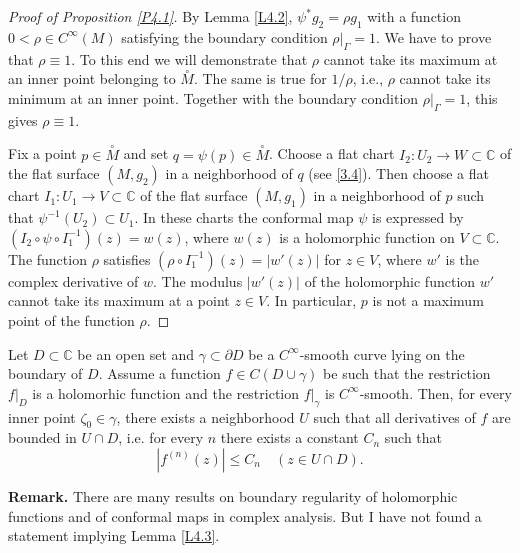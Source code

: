 \documentclass[12pt,reqno]{amsart}
\begin{document}
\begin{proof}[Proof of Proposition \ref{P4.1}]
By Lemma \ref{L4.2}, $\psi^*g_2=\rho g_1$ with a function $0<\rho\in C^\infty(M)$ satisfying the boundary condition $\rho|_\Gamma=1$. We have to prove that $\rho\equiv1$. To this end we will demonstrate that $\rho$ cannot take its maximum at an inner point belonging to
$\stackrel\circ M$. The same is true for $1/\rho$, i.e., $\rho$ cannot take its minimum at an inner point. Together with the boundary condition $\rho|_\Gamma=1$, this gives $\rho\equiv1$.

Fix a point $p\in\stackrel\circ M$ and set $q=\psi(p)\in\stackrel\circ M$. Choose a flat chart
$I_2:U_2\to W\subset{\mathbb C}$ of the flat surface $(M,g_2)$ in a neighborhood  of $q$ (see \eqref{3.4}). Then choose a flat chart $I_1:U_1\to V\subset{\mathbb C}$ of the flat surface $(M,g_1)$ in a neighborhood  of $p$ such that $\psi^{-1}(U_2)\subset U_1$. In these charts the conformal map $\psi$ is expressed by $(I_2\circ\psi\circ I_1^{-1})(z)=w(z)$, where $w(z)$ is a holomorphic function on
$V\subset{\mathbb C}$. The function $\rho$ satisfies $(\rho\circ I_1^{-1})(z)=|w'(z)|$ for $z\in V$, where $w'$ is the complex derivative of $w$. The modulus $|w'(z)|$ of the holomorphic function $w'$ cannot take its maximum at a point $z\in V$. In particular, $p$ is not a maximum point of the function $\rho$.
\end{proof}

\begin{lemma} \label{L4.3}
Let $D\subset{\mathbb C}$ be an open set and $\gamma\subset\partial D$ be a $C^\infty$-smooth curve lying on the boundary of $D$. Assume a function $f\in C(D\cup\gamma)$ be such that the restriction $f|_D$ is a holomorhic function and the restriction $f|_\gamma$ is $C^\infty$-smooth. Then, for every inner point $\zeta_0\in\gamma$, there exists a neighborhood $U$ such that all derivatives of $f$ are bounded in $U\cap D$, i.e. for every $n$ there exists a constant $C_n$ such that
\begin{equation}
|f^{(n)}(z)|\le C_n\quad(z\in U\cap D).
                                \label{4.1}
\end{equation}
\end{lemma}

{\bf Remark.} There are many results on boundary regularity of holomorphic functions and of conformal maps in complex analysis. But I have not found a statement implying Lemma \ref{L4.3}.
\end{document}

